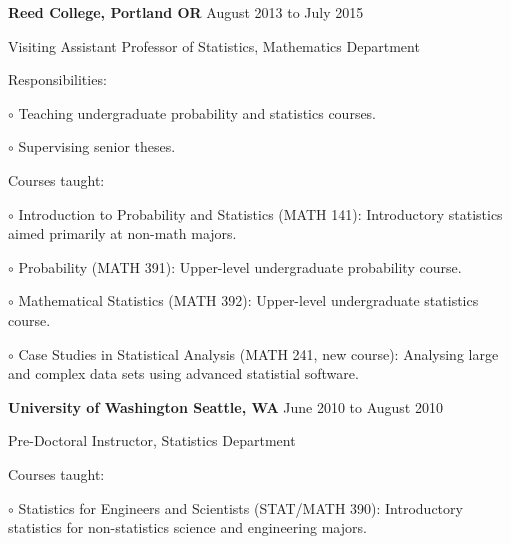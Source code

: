 \documentclass[10pt]{article}
\newcommand{\halfblankline}{\quad\vspace{-0.5\baselineskip}\pagebreak[3]}
\begin{document}
\textbf{Reed College, Portland OR} \hfill {August 2013 to July 2015}
\begin{outerlist}
 	\item[] Visiting Assistant Professor of Statistics, Mathematics Department
    \begin{innerlist}
     	\item Responsibilities:
		\begin{innerlist}
		\item[$\circ$] Teaching undergraduate probability and statistics courses.
		\item[$\circ$] Supervising senior theses.
		\end{innerlist}
		\item Courses taught:
		\begin{innerlist}
		\item[$\circ$] Introduction to Probability and Statistics (MATH 141):  Introductory
		statistics aimed primarily at non-math majors.
		\item[$\circ$] Probability (MATH 391): Upper-level undergraduate probability course.
		\item[$\circ$] Mathematical Statistics (MATH 392): Upper-level undergraduate statistics course.
		\item[$\circ$] Case Studies in Statistical Analysis (MATH 241, new course):  Analysing large and complex data sets using advanced statistial software.
	\end{innerlist}
    \end{innerlist}
\end{outerlist}

\halfblankline

\textbf{University of Washington Seattle, WA} \hfill {June 2010 to August 2010}
\begin{outerlist}
 	\item[] Pre-Doctoral Instructor, Statistics Department
    \begin{innerlist}
		\item Courses taught:
		\begin{innerlist}
		\item[$\circ$] Statistics for Engineers and Scientists (STAT/MATH 390):
		Introductory statistics for non-statistics science and engineering majors.
		\end{innerlist}
    \end{innerlist}
\end{outerlist}
\end{document}

